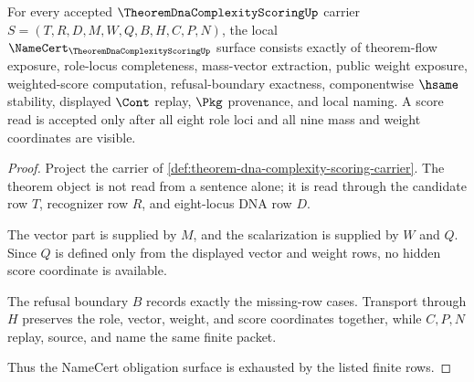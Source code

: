 \begin{theorem}
\label{thm:theorem-dna-complexity-scoring-obligation-surface}
For every accepted $\TheoremDnaComplexityScoringUp$ carrier $S=(T,R,D,M,W,Q,B,H,C,P,N)$, the local $\NameCert_{\TheoremDnaComplexityScoringUp}$ surface consists exactly of theorem-flow exposure, role-locus completeness, mass-vector extraction, public weight exposure, weighted-score computation, refusal-boundary exactness, componentwise $\hsame$ stability, displayed $\Cont$ replay, $\Pkg$ provenance, and local naming. A score read is accepted only after all eight role loci and all nine mass and weight coordinates are visible.
\end{theorem}
\begin{proof}
Project the carrier of \autoref{def:theorem-dna-complexity-scoring-carrier}. The theorem object is not read from a sentence alone; it is read through the candidate row $T$, recognizer row $R$, and eight-locus DNA row $D$.

The vector part is supplied by $M$, and the scalarization is supplied by $W$ and $Q$. Since $Q$ is defined only from the displayed vector and weight rows, no hidden score coordinate is available.

The refusal boundary $B$ records exactly the missing-row cases. Transport through $H$ preserves the role, vector, weight, and score coordinates together, while $C,P,N$ replay, source, and name the same finite packet.

Thus the NameCert obligation surface is exhausted by the listed finite rows.
\end{proof}

